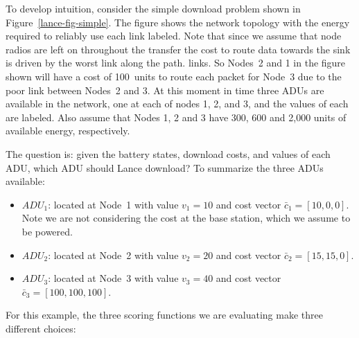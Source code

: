 To develop intuition, consider the simple download problem shown in
Figure~\ref{lance-fig-simple}. The figure shows the network topology with the
energy required to reliably use each link labeled. Note that since we assume
that node radios are left on throughout the transfer the cost to route data
towards the sink is driven by the worst link along the path. links. So
Nodes~2 and 1 in the figure shown will have a cost of 100~units to route each
packet for Node~3 due to the poor link between Nodes~2 and 3. At this moment
in time three ADUs are available in the network, one at each of nodes 1, 2,
and 3, and the values of each are labeled. Also assume that Nodes 1, 2 and 3
have 300, 600 and 2,000 units of available energy, respectively.

The question is: given the battery states, download costs, and values of each
ADU, which ADU should Lance download? To summarize the three ADUs available:

\begin{itemize}

\item \textbf{$ADU_1$}: located at Node~1 with value $v_1 = 10$ and cost vector
$\bar{c}_1 = \left[10, 0, 0\right]$. Note we are not considering the cost at the base
station, which we assume to be powered.

\item \textbf{$ADU_2$}: located at Node~2 with value $v_2 = 20$ and cost vector
$\bar{c}_2 = \left[15, 15, 0\right]$.

\item \textbf{$ADU_3$}: located at Node~3 with value $v_3 = 40$ and cost vector
$\bar{c}_3 = \left[100, 100, 100\right]$.

\end{itemize}

For this example, the three scoring functions we are evaluating make three
different choices:

